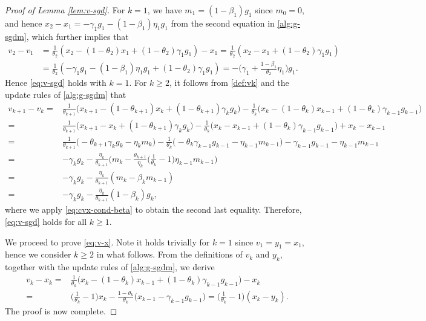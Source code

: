 \documentclass[10pt]{article}
\numberwithin{equation}{section}
\theoremstyle{definition}
\begin{document}
\begin{proof}[Proof of Lemma \ref{lem:v-sgd}]
For $k=1$, we have $m_1=(1-\beta_1)g_1$ since $m_0=0$, and hence $x_2 - x_1 = - \gamma_1 g_1-(1-\beta_1)\eta_1 g_1$ from the second equation in \eqref{alg:g-sgdm}, which further implies that
\begin{align*}
v_2-v_1 & = \frac{1}{\theta_2}(x_2-(1-\theta_2) x_1+(1-\theta_2) \gamma_1 g_1)- x_1 = \frac{1}{\theta_2}(x_2- x_1+(1-\theta_2) \gamma_1 g_1) \\
& =\frac{1}{\theta_2}(-\gamma_1 g_1-(1-\beta_1)\eta_1 g_1+(1-\theta_2) \gamma_1 g_1)=-\Big(\gamma_1+\frac{1-\beta_1}{\theta_2}\eta_1\Big)g_1.
\end{align*}
Hence \eqref{eq:v-sgd} holds with $k=1$.
For $k\ge 2$, it follows from \eqref{def:vk} and the update rules of \eqref{alg:g-sgdm} that
\begin{align*}
%
%
%
%
%
v_{k+1}-v_k =& \frac{1}{\theta_{k+1}}\big(x_{k+1}-(1-\theta_{k+1}) x_k+(1-\theta_{k+1}) \gamma_k g_k\big)-\frac{1}{\theta_k}\big(x_k-(1-\theta_k) x_{k-1}+(1-\theta_k) \gamma_{k-1} g_{k-1}\big)\\
= & \frac{1}{\theta_{k+1}}\big(x_{k+1}- x_k+(1-\theta_{k+1}) \gamma_k g_k\big)-\frac{1}{\theta_k}\big(x_k-x_{k-1}+(1-\theta_k) \gamma_{k-1} g_{k-1}\big)+x_k - x_{k-1}\\
= & \frac{1}{\theta_{k+1}}\big(-\theta_{k+1} \gamma_k g_k - \eta_k m_k\big)-\frac{1}{\theta_k}\big(-\theta_k \gamma_{k-1} g_{k-1} - \eta_{k-1} m_{k-1}\big) - \gamma_{k-1}g_{k-1} - \eta_{k-1} m_{k-1} \\
 = & - \gamma_k g_k - \frac{\eta_k}{\theta_{k+1}} \Big(m_k - \frac{\theta_{k+1}}{\eta_k}\Big(\frac{1}{\theta_k}-1\Big)\eta_{k-1} m_{k-1}\Big)\\
 = & - \gamma_k g_k - \frac{\eta_k}{\theta_{k+1}} (m_k - \beta_k m_{k-1})\\
 = & - \gamma_k g_k - \frac{\eta_k}{\theta_{k+1}}(1-\beta_k)g_k,
\end{align*}
where we apply \eqref{eq:cvx-cond-beta} to obtain the second last equality. Therefore, \eqref{eq:v-sgd} holds for all $k\ge 1$. 

We proceed to prove \eqref{eq:v-x}. Note it holds trivially for $k=1$ since $v_1 = y_1 = x_1$, hence we consider $k\ge 2$ in what follows. From the definitions of $v_k$ and $y_k$, together with the update rules of \eqref{alg:g-sgdm}, we derive
\begin{align*}
    v_k-x_k = & \frac{1}{\theta_k}\big(x_k-(1-\theta_k) x_{k-1}+(1-\theta_k) \gamma_{k-1} g_{k-1}\big) - x_k\\
    = & \Big(\frac{1}{\theta_k}-1\Big)x_k-\frac{1-\theta_k}{\theta_k}\big(x_{k-1} - \gamma_{k-1} g_{k-1}\big)= \Big(\frac{1}{\theta_k}-1\Big)(x_k - y_k).
\end{align*}
The proof is now complete.
\end{proof}
\end{document}
